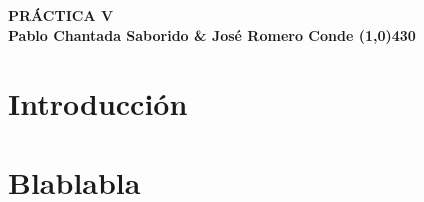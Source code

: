 \documentclass{article}
\begin{document}
\begin{center}
    \LARGE\bfseries PRÁCTICA V\\
    \small Pablo Chantada Saborido \& José Romero Conde
    \line(1,0){430}
\end{center}

\section*{Introducción}


\section*{Blablabla}
\end{document}
